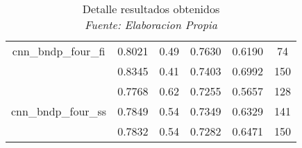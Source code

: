 \begin{table}[!ht]
\begin{tabular}{|c|c|c|c|c|c|}
		cnn\_bndp\_four\_fi & 0.8021 & 0.49 & 0.7630 & 0.6190 & 74 \\ \cline{2-6}
		~ & 0.8345 & 0.41 & 0.7403 & 0.6992 & 150 \\ \hline
		~ & 0.7768 & 0.62 & 0.7255 & 0.5657 & 128 \\ \cline{2-6}
		cnn\_bndp\_four\_ss & 0.7849 & 0.54 & 0.7349 & 0.6329 & 141 \\ \cline{2-6}
		~ & 0.7832 & 0.54 & 0.7282 & 0.6471 & 150 \\ \hline
	\end{tabular}
	\caption[Detalle resultados obtenidos]{Detalle resultados obtenidos
		\\\textit{Fuente: Elaboracion Propia}}
	\label{tbl:10}
\end{table}
